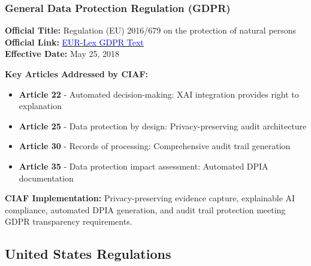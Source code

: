 \documentclass[12pt,a4paper]{article}
\begin{document}
\subsubsection{General Data Protection Regulation (GDPR)}
\begin{technicalbox}
\textbf{Official Title:} Regulation (EU) 2016/679 on the protection of natural persons\\
\textbf{Official Link:} \href{https://eur-lex.europa.eu/eli/reg/2016/679/oj}{\textcolor{blue}{EUR-Lex GDPR Text}}\\
\textbf{Effective Date:} May 25, 2018

\textbf{Key Articles Addressed by CIAF:}
\begin{itemize}
\item \textbf{Article 22} - Automated decision-making: XAI integration provides right to explanation
\item \textbf{Article 25} - Data protection by design: Privacy-preserving audit architecture
\item \textbf{Article 30} - Records of processing: Comprehensive audit trail generation
\item \textbf{Article 35} - Data protection impact assessment: Automated DPIA documentation
\end{itemize}

\textbf{CIAF Implementation:} Privacy-preserving evidence capture, explainable AI compliance, automated DPIA generation, and audit trail protection meeting GDPR transparency requirements.
\end{technicalbox}

\subsection{United States Regulations}
\end{document}
